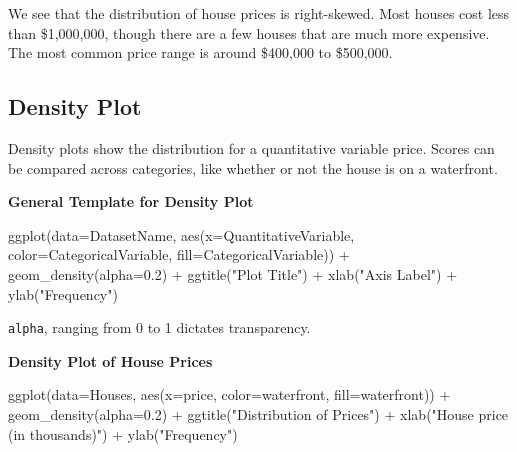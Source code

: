 \documentclass[
  letterpaper,
  DIV=11,
  numbers=noendperiod]{scrreprt}
\newenvironment{Shaded}{\begin{snugshade}}{\end{snugshade}}
\newcommand{\AttributeTok}[1]{\textcolor[rgb]{0.40,0.45,0.13}{#1}}
\newcommand{\FloatTok}[1]{\textcolor[rgb]{0.68,0.00,0.00}{#1}}
\newcommand{\FunctionTok}[1]{\textcolor[rgb]{0.28,0.35,0.67}{#1}}
\newcommand{\NormalTok}[1]{\textcolor[rgb]{0.00,0.23,0.31}{#1}}
\newcommand{\SpecialCharTok}[1]{\textcolor[rgb]{0.37,0.37,0.37}{#1}}
\newcommand{\StringTok}[1]{\textcolor[rgb]{0.13,0.47,0.30}{#1}}
\begin{document}
We see that the distribution of house prices is right-skewed. Most
houses cost less than \$1,000,000, though there are a few houses that
are much more expensive. The most common price range is around \$400,000
to \$500,000.

\subsection{Density Plot}\label{density-plot}

Density plots show the distribution for a quantitative variable price.
Scores can be compared across categories, like whether or not the house
is on a waterfront.

\textbf{General Template for Density Plot}

\begin{Shaded}
\begin{Highlighting}[]
\FunctionTok{ggplot}\NormalTok{(}\AttributeTok{data=}\NormalTok{DatasetName, }\FunctionTok{aes}\NormalTok{(}\AttributeTok{x=}\NormalTok{QuantitativeVariable,}
                             \AttributeTok{color=}\NormalTok{CategoricalVariable, }\AttributeTok{fill=}\NormalTok{CategoricalVariable)) }\SpecialCharTok{+} 
  \FunctionTok{geom\_density}\NormalTok{(}\AttributeTok{alpha=}\FloatTok{0.2}\NormalTok{) }\SpecialCharTok{+} 
  \FunctionTok{ggtitle}\NormalTok{(}\StringTok{"Plot Title"}\NormalTok{) }\SpecialCharTok{+}
  \FunctionTok{xlab}\NormalTok{(}\StringTok{"Axis Label"}\NormalTok{) }\SpecialCharTok{+} 
  \FunctionTok{ylab}\NormalTok{(}\StringTok{"Frequency"}\NormalTok{) }
\end{Highlighting}
\end{Shaded}

\texttt{alpha}, ranging from 0 to 1 dictates transparency.

\textbf{Density Plot of House Prices}

\begin{Shaded}
\begin{Highlighting}[]
\FunctionTok{ggplot}\NormalTok{(}\AttributeTok{data=}\NormalTok{Houses, }\FunctionTok{aes}\NormalTok{(}\AttributeTok{x=}\NormalTok{price, }\AttributeTok{color=}\NormalTok{waterfront, }\AttributeTok{fill=}\NormalTok{waterfront)) }\SpecialCharTok{+} 
  \FunctionTok{geom\_density}\NormalTok{(}\AttributeTok{alpha=}\FloatTok{0.2}\NormalTok{) }\SpecialCharTok{+} 
  \FunctionTok{ggtitle}\NormalTok{(}\StringTok{"Distribution of Prices"}\NormalTok{) }\SpecialCharTok{+}
  \FunctionTok{xlab}\NormalTok{(}\StringTok{"House price (in thousands)"}\NormalTok{) }\SpecialCharTok{+} 
  \FunctionTok{ylab}\NormalTok{(}\StringTok{"Frequency"}\NormalTok{) }
\end{Highlighting}
\end{Shaded}
\end{document}

